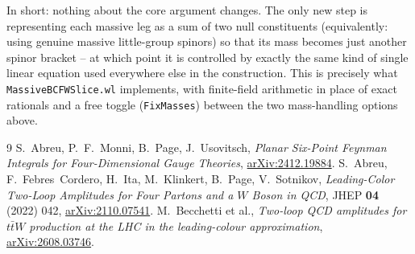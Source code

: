 \documentclass[11pt]{article}
\theoremstyle{definition}
\begin{document}
In short: nothing about the core argument changes. The only new step is representing each
massive leg as a sum of two null constituents (equivalently: using genuine massive
little-group spinors) so that its mass becomes just another spinor bracket -- at which point it
is controlled by exactly the same kind of single linear equation used everywhere else in the
construction. This is precisely what \texttt{MassiveBCFWSlice.wl} implements, with
finite-field arithmetic in place of exact rationals and a free toggle (\texttt{FixMasses}) between
the two mass-handling options above.

\begin{thebibliography}{9}
 S.~Abreu, P.~F.~Monni, B.~Page, J.~Usovitsch,
\emph{Planar Six-Point Feynman Integrals for Four-Dimensional Gauge Theories},
\href{https://arxiv.org/abs/2412.19884}{arXiv:2412.19884}.
 S.~Abreu, F.~Febres~Cordero, H.~Ita, M.~Klinkert, B.~Page, V.~Sotnikov,
\emph{Leading-Color Two-Loop Amplitudes for Four Partons and a $W$ Boson in QCD},
JHEP \textbf{04} (2022) 042, \href{https://arxiv.org/abs/2110.07541}{arXiv:2110.07541}.
 M.~Becchetti et al., \emph{Two-loop QCD amplitudes for $t\bar t W$ production at the
LHC in the leading-colour approximation}, \href{https://arxiv.org/abs/2608.03746}{arXiv:2608.03746}.
\end{thebibliography}
\end{document}
